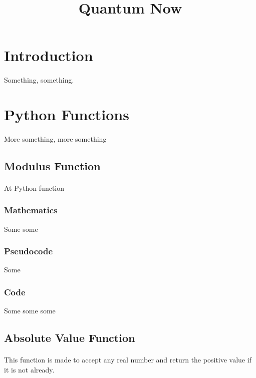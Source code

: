 \documentclass{article}
\title{Quantum Now}
\begin{document}
	\setlength{\columnsep}{20pt}
	\setlength{\columnseprule}{1pt}

	\maketitle
	\tableofcontents

	\section{Introduction}
	\paragraph{}
	Something, something.

	\section{Python Functions}
	\paragraph{}
	More something, more something
		\subsection{Modulus Function}
		\paragraph{}
		At Python function
			\subsubsection{Mathematics}
			Some some
			\subsubsection{Pseudocode}
			Some
			\subsubsection{Code}
			Some some some
		\subsection{Absolute Value Function}
		\paragraph{}
		This function is made to accept any real number and return the positive value if it is not already.
\end{document}
